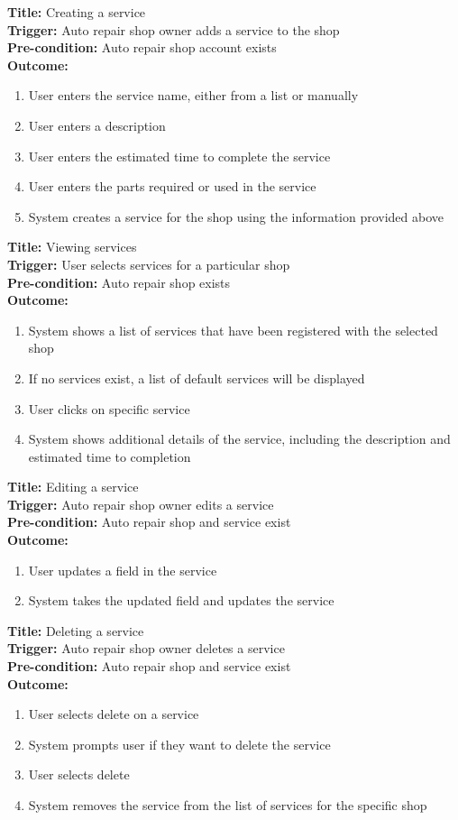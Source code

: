 \documentclass[12pt]{article}
\begin{document}
\textbf{Title:} Creating a service\\
\textbf{Trigger:} Auto repair shop owner adds a service to the shop\\
\textbf{Pre-condition:} Auto repair shop account exists\\
\textbf{Outcome:}
\begin{enumerate}
	\item User enters the service name, either from a list or manually
	\item User enters a description
	\item User enters the estimated time to complete the service
	\item User enters the parts required or used in the service
	\item System creates a service for the shop using the information provided above
\end{enumerate}

\textbf{Title:} Viewing services\\
\textbf{Trigger:} User selects services for a particular shop\\
\textbf{Pre-condition:} Auto repair shop exists\\
\textbf{Outcome:}
\begin{enumerate}
	\item System shows a list of services that have been registered with the selected shop
	\item If no services exist, a list of default services will be displayed
	\item User clicks on specific service
	\item System shows additional details of the service, including the description and estimated time to
	      completion
\end{enumerate}

\textbf{Title:} Editing a service\\
\textbf{Trigger:} Auto repair shop owner edits a service\\
\textbf{Pre-condition:} Auto repair shop and service exist\\
\textbf{Outcome:}
\begin{enumerate}
	\item User updates a field in the service
	\item System takes the updated field and updates the service
\end{enumerate}

\textbf{Title:} Deleting a service\\
\textbf{Trigger:} Auto repair shop owner deletes a service\\
\textbf{Pre-condition:} Auto repair shop and service exist\\
\textbf{Outcome:}
\begin{enumerate}
	\item User selects delete on a service
	\item System prompts user if they want to delete the service
	\item User selects delete
	\item System removes the service from the list of services for the specific shop
\end{enumerate}
\end{document}
